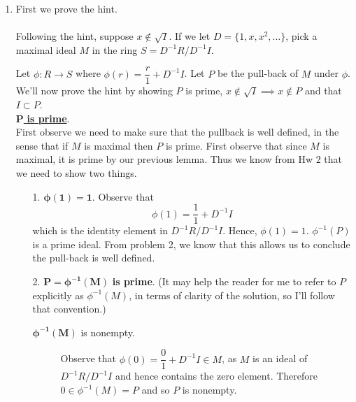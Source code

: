 \begin{prf}
\begin{enumerate}
            \item 
            First we prove the hint. 
            \\
            \\
            Following the hint, suppose $x \not\in \sqrt{I}$. If we
            let $D = \{1, x, x^2, \dots\}$, pick a maximal ideal $M$ in
            the ring $S = D^{-1}R/D^{-1}I$. 
    
            Let $\phi: R \to S$ where $\phi(r) = \dfrac{r}{1} + D^{-1}I$.
            Let $P$ be the pull-back of $M$ under $\phi$. 
            We'll now prove the hint by showing $P$ is prime, $x \not\in
            \sqrt{I} \implies x \not\in P$ and that $I \subset P$.
            \\[1.2ex]
            \underline{$\bm{P}$ \textbf{is prime}}.\\[1.2ex]
            First observe we need to make sure that the pullback is well
            defined, in the sense that 
            if $M$ is maximal then $P$ is prime. First observe that since
            $M$ is maximal, it is prime by our previous lemma. Thus we
            know from Hw 2 
            that we need to show two things.
            \begin{itemize}
                \item[1.] $\bm{\phi(1) = 1}.$ Observe that 
                \[
                    \phi(1) = \dfrac{1}{1} + D^{-1}I   
                \] 
                which is the identity element in $D^{-1}R/D^{-1}I$. Hence,
                $\phi(1) = 1$. 
                $\phi^{-1}(P)$ is a prime ideal. From problem 2, we know
                that this allows us to conclude the pull-back is well defined.
    
                \item[2.] $\bm{P = \phi^{-1}(M)}$ \textbf{is prime}. (It
                may help the reader for me to refer to $P$ explicitly as
                $\phi^{-1}(M)$, in terms of clarity of the solution, so
                I'll follow that convention.)
                \begin{description}
                    \item[$\bm{\phi^{-1}(M)}$ is nonempty.]
                    Observe that $\phi(0) = \dfrac{0}{1} + D^{-1}I \in M$,
                    as $M$ is an ideal of $D^{-1}R/D^{-1}I$ and hence
                    contains the zero element. Therefore $0 \in
                    \phi^{-1}(M) = P$ and so
                    $P$ is nonempty. 
                    

\end{description}
\end{itemize}
\end{enumerate}
\end{prf}
